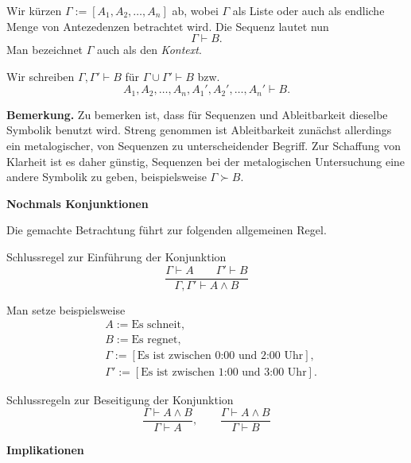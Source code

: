 \documentclass[8pt]{beamer}
\newcommand{\strong}[1]{\textsf{\textbf{#1}}}
\newcommand{\centerheadline}[1]{%
  \begin{center}\strong{#1}\end{center}}
\newcommand{\parspace}{\vspace{0.8em}}
\begin{document}
\begin{frame}
Wir kürzen $\Gamma := [A_1,A_2,\ldots,A_n]$ ab, wobei $\Gamma$
als Liste oder auch als endliche Menge von Antezedenzen betrachtet wird.
Die Sequenz lautet nun
\[\Gamma\vdash B.\]
Man bezeichnet $\Gamma$ auch als den \emph{Kontext}.\pause

\parspace
Wir schreiben
$\Gamma,\Gamma'\vdash B$ für $\Gamma\cup\Gamma'\vdash B$ bzw.
\[A_1,A_2,\ldots,A_n,A_1',A_2',\ldots,A_n'\vdash B.\]

\parspace
\begin{footnotesize}
\strong{Bemerkung.} Zu bemerken ist, dass für Sequenzen und Ableitbarkeit
dieselbe Symbolik benutzt wird. Streng genommen ist Ableitbarkeit zunächst
allerdings ein metalogischer, von Sequenzen zu unterscheidender Begriff.
Zur Schaffung von Klarheit ist es daher günstig, Sequenzen bei der
metalogischen Untersuchung eine andere Symbolik zu geben,
beispielsweise $\Gamma\succ B$.
\end{footnotesize}
\end{frame}

\begin{frame}
\centerheadline{Nochmals Konjunktionen}
\end{frame}

\begin{frame}
Die gemachte Betrachtung führt zur folgenden allgemeinen Regel.
\begin{block}{Schlussregel zur Einführung der Konjunktion}
\[\dfrac{\Gamma\vdash A\qquad\Gamma'\vdash B}{\Gamma,\Gamma'\vdash A\land B}\]
\end{block}\pause
Man setze beispielsweise
\begin{align*}
& A := \text{Es schneit},\\
& B := \text{Es regnet},\\
& \Gamma := [\text{Es ist zwischen 0:00 und 2:00 Uhr}],\\
& \Gamma' := [\text{Es ist zwischen 1:00 und 3:00 Uhr}].
\end{align*}
\end{frame}

\begin{frame}
\begin{block}{Schlussregeln zur Beseitigung der Konjunktion}
\[\dfrac{\Gamma\vdash A\land B}{\Gamma\vdash A},\qquad
\dfrac{\Gamma\vdash A\land B}{\Gamma\vdash B}\]
\end{block}
\end{frame}

\begin{frame}
\centerheadline{Implikationen}
\end{frame}
\end{document}
